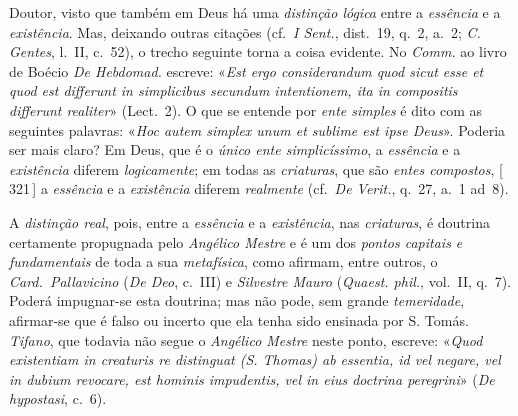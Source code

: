 \documentclass[12pt,a4paper]{article}
\newcommand{\pg}[1]{\thinspace\textup{[\,#1\,]}\thinspace}
\begin{document}
{  Doutor, visto que também em Deus há uma \emph{distinção lógica} entre a
  \emph{essência} e a \emph{existência}. \textemdash{} Mas, deixando outras
  citações (cf.\ \emph{I Sent.}, dist.~19, q.~2, a.~2; \emph{C. Gentes}, l.~II,
  c.~52), o trecho seguinte torna a coisa evidente. No \emph{Comm.} ao livro de
  Boécio \emph{De Hebdomad.} escreve: «\textit{Est ergo considerandum quod
  sicut esse et quod est differunt in simplicibus secundum intentionem, ita in
  compositis differunt realiter}» (Lect.~2). O que se entende por \emph{ente
  simples} é dito com as seguintes palavras: «\textit{Hoc autem simplex unum et
  sublime est ipse Deus}». Poderia ser mais claro? Em Deus, que é o \emph{único
  ente simplicíssimo}, a \emph{essência} e a \emph{existência} diferem
  \emph{logicamente}; em todas as \emph{criaturas}, que são \emph{entes
  compostos}, \pg{321} a \emph{essência} e a \emph{existência} diferem
  \emph{realmente} (cf.\ \emph{De Verit.}, q.~27, a.~1 ad~8).

  A \emph{distinção real}, pois, entre a \emph{essência} e a \emph{existência},
  nas \emph{criaturas}, é doutrina certamente propugnada pelo \emph{Angélico
  Mestre} e é um dos \emph{pontos capitais e fundamentais} de toda a sua
  \emph{metafísica}, como afirmam, entre outros, o \emph{Card.\ Pallavicino}
  (\emph{De Deo}, c.~III) e \emph{Silvestre Mauro} (\emph{Quaest. phil.},
  vol.~II, q.~7). \textemdash{} Poderá impugnar-se esta doutrina; mas não pode,
  sem grande \emph{temeridade}, afirmar-se que é falso ou incerto que ela tenha
  sido ensinada por S. Tomás. \emph{Tifano}, que todavia não segue o
  \emph{Angélico Mestre} neste ponto, escreve: «\textit{Quod existentiam in
  creaturis re distinguat (S. Thomas) ab essentia, id vel negare, vel in dubium
  revocare, est hominis impudentis, vel in eius doctrina peregrini}» (\emph{De
  hypostasi}, c.~6).}
\end{document}
